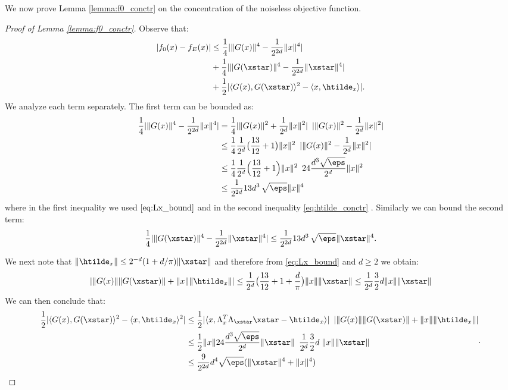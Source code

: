 We now prove Lemma \ref{lemma:f0_conctr} on the concentration of 
the noiseless objective function.

\begin{proof}[Proof of Lemma \ref{lemma:f0_conctr}]
	Observe that:
	\[
	\begin{aligned}
	|f_0(x) - f_E(x)| &\leq \frac{1}{4} |\|G(x)\|^4 - \frac{1}{2^{2d}} \|x\|^4 | \\ 
	&+\frac{1}{4}  |\|G(\xstar)\|^4 - \frac{1}{2^{2d}} \|\xstar\|^4 | \\ 
	&+ \frac{1}{2} |\langle G(x),G(\xstar) \rangle^2 - \langle x, \htilde_x \rangle |.
	\end{aligned}
	\]
	We analyze each term separately. 
	The first term can be bounded as:
	\begin{equation*}
	\begin{aligned}
	\frac{1}{4} |\|G(x)\|^4 - \frac{1}{2^{2d}} \|x\|^4 | &=  \frac{1}{4} |\|G(x)\|^2 + \frac{1}{2^d} \|x\|^2 | \;\:  | \|G(x)\|^2 - \frac{1}{2^d} \|x\|^2 | \\ 
	&\leq  \frac{1}{4}  \frac{1}{2^d} \big( \frac{13}{12} + 1 \big) \|x\|^2  \;\:  | \|G(x)\|^2 - \frac{1}{2^d} \|x\|^2 | \\
	&\leq  \frac{1}{4}  \frac{1}{2^d} \Big( \frac{13}{12} + 1 \Big) \|x\|^2  \; \: 24 \frac{d^3 \sqrt{\eps}}{2^d} \|x\|^2  \\	
	&\leq \frac{1}{2^{2d}} 13 d^3\, \sqrt{\eps} \|x\|^4	
	\end{aligned}
	\end{equation*}
	where in the first inequality we used $\eqref{eq:Lx_bound}$ and in the second inequality \eqref{eq:htilde_conctr} . 
	Similarly we can bound the second term:
	\[
	\frac{1}{4} |\|G(\xstar)\|^4 - \frac{1}{2^{2d}} \|\xstar\|^4 |  \leq \frac{1}{2^{2d}} 13 d^3\, \sqrt{\eps} \|\xstar\|^4.
	\] 
	
	We next note that $\|\htilde_x \| \leq 2^{-d} (1 + d/\pi) \|\xstar\|$ and therefore
	from \eqref{eq:Lx_bound} and $d\geq 2$ we obtain:
	\[
	|\|G(x)\| \|G(\xstar)\| + \|x\| \|\htilde_x\| | \leq \frac{1}{2^d}	\big(\frac{13}{12} + 1 + \frac{d}{\pi}	\big) \|x\| \|\xstar\| \leq \frac{1}{2^d} \frac{3}{2} d \|x\| \|\xstar\|	
	\]
	We can then conclude that:
	\[
	\begin{aligned}
	\frac{1}{2} |\langle G(x),G(\xstar) \rangle^2 - \langle x, \htilde_x \rangle^2 | 
	&\leq	\frac{1}{2}  |\langle x, \Lambda_x^T \Lambda_\xstar \xstar - \htilde_x \rangle| \: \; |\|G(x)\| \|G(\xstar)\| + \|x\| \|\htilde_x\| | \\
	&\leq 	\frac{1}{2} \|x\| 24 \frac{d^3 \sqrt{\eps}}{2^d} \|\xstar\| \: \;
	\frac{1}{2^d} \frac{3}{2} d \; \|x\| \|\xstar\|	\\ 
	&\leq \frac{9}{2^{2d}} d^4 \sqrt{\eps}  (\|\xstar\|^4 + \|x\|^4) 
	\end{aligned}.
	\]
\end{proof}

